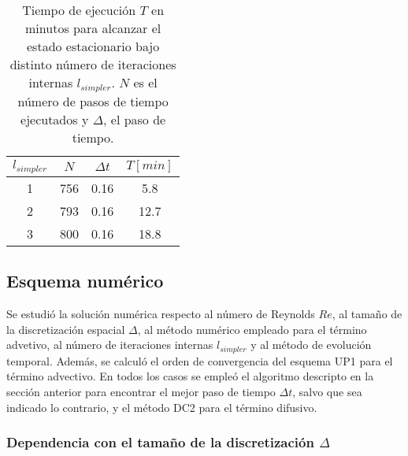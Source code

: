 \documentclass[aps,prb,twocolumn,superscriptaddress,floatfix,longbibliography,10pt]{revtex4-2}
\newcounter{para}
\begin{document}



\begin{table}[]
  \begin{tabular}{|c|c|c|c|}
  \hline
  \multicolumn{1}{|c|}{$l_{simpler}$ \quad} & \multicolumn{1}{c|}{$N$\quad} & \multicolumn{1}{c|}{$\Delta t$\quad} & \multicolumn{1}{c|}{$T [min]$} \\ \hline
  1 & 756 & 0.16 & 5.8 \\ \hline
  2 & 793 & 0.16 & 12.7 \\ \hline
  3 & 800 & 0.16 & 18.8 \\ \hline
  \end{tabular}
  \label{tabla:dt_costo_vs_lsimpler}
  \caption{Tiempo de ejecución $T$ en minutos para alcanzar el estado estacionario bajo distinto número de iteraciones internas $l_{simpler}$. $N$ es el número de pasos de tiempo ejecutados y $\Delta$, el paso de tiempo.}
\end{table}


\subsection{Esquema numérico}

Se estudió la solución numérica respecto al número de Reynolds $Re$, al tamaño de la discretización espacial $\Delta$, al método numérico empleado para el término advetivo, al número de iteraciones internas $l_{simpler}$ y al método de evolución temporal. Además, se calculó el orden de convergencia del esquema UP1 para el término advectivo. En todos los casos se empleó el algoritmo descripto en la sección anterior para encontrar el mejor paso de tiempo $\Delta t$, salvo que sea indicado lo contrario, y el método DC2 para el término difusivo.


\subsubsection{Dependencia con el tamaño de la discretización $\Delta$}
\end{document}
